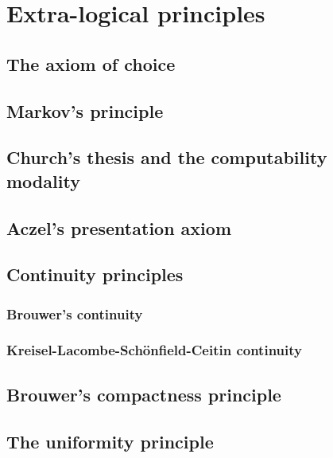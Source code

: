\chapter{Extra-logical principles}
\label{cha:extra-logic-princ}

\section{The axiom of choice}
\label{sec:ac}

\section{Markov's principle}
\label{sec:markovs-principle}

\section{Church's thesis and the computability modality}
\label{sec:church-thesis}

\section{Aczel's presentation axiom}
\label{sec:aczels-pres-axiom}

\section{Continuity principles}
\label{sec:cont-princ}

\subsection{Brouwer's continuity}
\label{sec:brouw-cont-princ}

\subsection{Kreisel-Lacombe-Schönfield-Ceitin continuity}
\label{sec:kreis-lacombe-schonf}

\section{Brouwer's compactness principle}
\label{sec:cont-princ}

\section{The uniformity principle}
\label{sec:uniformity-principle}



